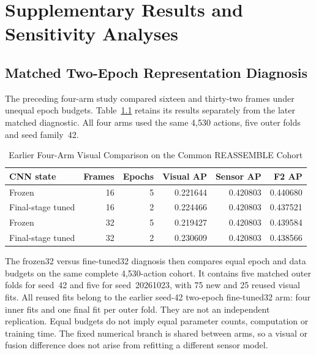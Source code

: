 \chapter{Supplementary Results and Sensitivity Analyses}
\label{app:supplementary-results}

\section{Matched Two-Epoch Representation Diagnosis}
The preceding four-arm study compared sixteen and thirty-two frames under unequal epoch
budgets. Table~\ref{tab:fourarm-visual-supplement} retains its results separately from
the later matched diagnostic. All four arms used the same 4,530 actions, five outer
folds and seed family~42.

\begin{table}[htbp]
\caption{Earlier Four-Arm Visual Comparison on the Common REASSEMBLE Cohort}
\label{tab:fourarm-visual-supplement}
\centering\small
\begin{tabular}{lrrrrr}\toprule
CNN state & Frames & Epochs & Visual AP & Sensor AP & F2 AP\\\midrule
Frozen & 16 & 5 & 0.221644 & 0.420803 & 0.440680\\
Final-stage tuned & 16 & 2 & 0.224466 & 0.420803 & 0.437521\\
Frozen & 32 & 5 & 0.219427 & 0.420803 & 0.439584\\
Final-stage tuned & 32 & 2 & 0.230609 & 0.420803 & 0.438566\\\bottomrule
\end{tabular}
\end{table}

The frozen32 versus fine-tuned32 diagnosis then compares equal epoch and data budgets on
the same complete 4,530-action cohort. It contains five matched outer folds for seed~42
and five for seed~20261023, with 75 new and 25 reused visual fits. All reused fits belong
to the earlier seed-42 two-epoch fine-tuned32 arm: four inner fits and one final fit per
outer fold. They are not an independent replication. Equal budgets do not imply equal
parameter counts, computation or training time. The fixed numerical branch is shared
between arms, so a visual or fusion difference does not arise from refitting a different
sensor model.

